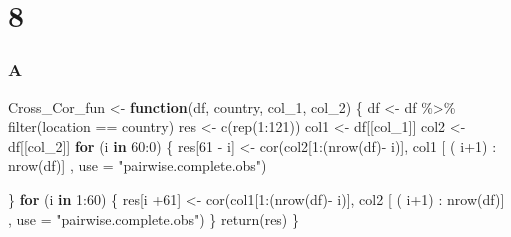 \documentclass[
]{article}
\newenvironment{Shaded}{\begin{snugshade}}{\end{snugshade}}
\newcommand{\AttributeTok}[1]{\textcolor[rgb]{0.77,0.63,0.00}{#1}}
\newcommand{\ControlFlowTok}[1]{\textcolor[rgb]{0.13,0.29,0.53}{\textbf{#1}}}
\newcommand{\DecValTok}[1]{\textcolor[rgb]{0.00,0.00,0.81}{#1}}
\newcommand{\FunctionTok}[1]{\textcolor[rgb]{0.00,0.00,0.00}{#1}}
\newcommand{\NormalTok}[1]{#1}
\newcommand{\OtherTok}[1]{\textcolor[rgb]{0.56,0.35,0.01}{#1}}
\newcommand{\SpecialCharTok}[1]{\textcolor[rgb]{0.00,0.00,0.00}{#1}}
\newcommand{\StringTok}[1]{\textcolor[rgb]{0.31,0.60,0.02}{#1}}
\begin{document}
\hypertarget{section-7}{%
\section{8}\label{section-7}}

\hypertarget{a-5}{%
\subsubsection{A}\label{a-5}}

\begin{Shaded}
\begin{Highlighting}[]
\NormalTok{Cross\_Cor\_fun }\OtherTok{\textless{}{-}} \ControlFlowTok{function}\NormalTok{(df, country, col\_1, col\_2) \{}
\NormalTok{  df }\OtherTok{\textless{}{-}}\NormalTok{ df }\SpecialCharTok{\%\textgreater{}\%} \FunctionTok{filter}\NormalTok{(location }\SpecialCharTok{==}\NormalTok{ country)}
\NormalTok{  res }\OtherTok{\textless{}{-}} \FunctionTok{c}\NormalTok{(}\FunctionTok{rep}\NormalTok{(}\DecValTok{1}\SpecialCharTok{:}\DecValTok{121}\NormalTok{))}
\NormalTok{  col1 }\OtherTok{\textless{}{-}}\NormalTok{ df[[col\_1]]}
\NormalTok{  col2 }\OtherTok{\textless{}{-}}\NormalTok{ df[[col\_2]]}
  \ControlFlowTok{for}\NormalTok{ (i }\ControlFlowTok{in} \DecValTok{60}\SpecialCharTok{:}\DecValTok{0}\NormalTok{) \{}
\NormalTok{    res[}\DecValTok{61} \SpecialCharTok{{-}}\NormalTok{ i] }\OtherTok{\textless{}{-}} \FunctionTok{cor}\NormalTok{(col2[}\DecValTok{1}\SpecialCharTok{:}\NormalTok{(}\FunctionTok{nrow}\NormalTok{(df)}\SpecialCharTok{{-}}\NormalTok{ i)], col1 [ ( i}\SpecialCharTok{+}\DecValTok{1}\NormalTok{) }\SpecialCharTok{:} \FunctionTok{nrow}\NormalTok{(df)] , }\AttributeTok{use =} \StringTok{"pairwise.complete.obs"}\NormalTok{)}

\NormalTok{  \}}
  \ControlFlowTok{for}\NormalTok{ (i }\ControlFlowTok{in} \DecValTok{1}\SpecialCharTok{:}\DecValTok{60}\NormalTok{) \{}
\NormalTok{    res[i }\SpecialCharTok{+}\DecValTok{61}\NormalTok{] }\OtherTok{\textless{}{-}} \FunctionTok{cor}\NormalTok{(col1[}\DecValTok{1}\SpecialCharTok{:}\NormalTok{(}\FunctionTok{nrow}\NormalTok{(df)}\SpecialCharTok{{-}}\NormalTok{ i)], col2 [ ( i}\SpecialCharTok{+}\DecValTok{1}\NormalTok{) }\SpecialCharTok{:} \FunctionTok{nrow}\NormalTok{(df)] , }\AttributeTok{use =} \StringTok{"pairwise.complete.obs"}\NormalTok{)}
\NormalTok{  \}}
  \FunctionTok{return}\NormalTok{(res)}
\NormalTok{\}}
\end{Highlighting}
\end{Shaded}
\end{document}
